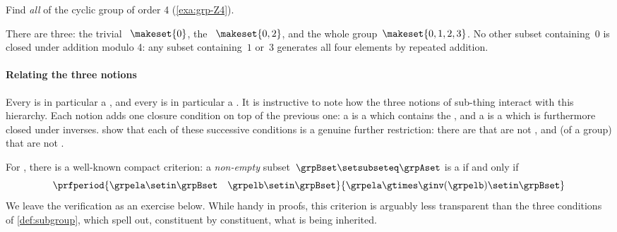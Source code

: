 \begin{exercise}
    \label{ex:subgroups-of-Z4}
    Find \emph{all}  of the cyclic group of order 4 (\cref{exa:grp-Z4}).
\end{exercise}
\begin{solution}
    There are three: the trivial ~$\makeset{0}$, the ~$\makeset{0,2}$, and the whole group~$\makeset{0,1,2,3}$.
    No other subset containing~$0$ is closed under addition modulo 4: any subset containing~$1$ or~$3$ generates all four elements by repeated addition.
\end{solution}

\paragraph{Relating the three notions}

Every  is in particular a , and every  is in particular a .
It is instructive to note how the three notions of sub-thing interact with this hierarchy.
Each notion adds one closure condition on top of the previous one: a  is a  which contains the , and a  is a  which is furthermore closed under inverses.
 show that each of these successive conditions is a genuine further restriction: there are  that are not , and  (of a group) that are not .

\begin{remark}
    For , there is a well-known compact criterion: a \emph{non-empty} subset~$\grpBset \setsubseteq \grpAset$ is a  if and only if
    \begin{equation}
        \prfperiod{
            \grpela \setin \grpBset \quad \grpelb \setin \grpBset
        }{
            \grpela \gtimes \ginv(\grpelb) \setin \grpBset
        }
    \end{equation}
    We leave the verification as an exercise below.
    While handy in proofs, this criterion is arguably less transparent than the three conditions of \cref{def:subgroup}, which spell out, constituent by constituent, what is being inherited.
\end{remark}

